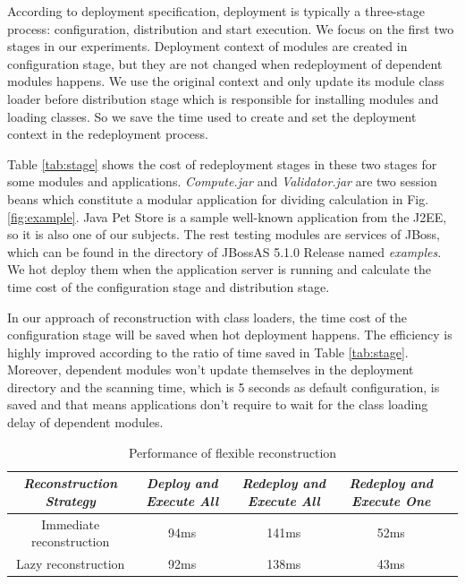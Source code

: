 \documentclass[conference]{IEEEtran}
\begin{document}
According to deployment specification\cite{jsr88}, deployment is typically a three-stage process: configuration, distribution and start execution.
We focus on the first two stages in our experiments.
Deployment context of modules are created in configuration stage, but they are not changed when redeployment of dependent modules happens.
We use the original context and only update its module class loader before distribution stage which is responsible for installing modules and loading classes.
So we save the time used to create and set the deployment context in the redeployment process.

Table \ref{tab:stage} shows the cost of redeployment stages in these two stages for some modules and applications.
\emph{Compute.jar} and \emph{Validator.jar} are two session beans which constitute a modular application for dividing calculation in Fig. \ref{fig:example}.
Java Pet Store\cite{java_pet_store} is a sample well-known application from the J2EE\cite{j2ee}, so it is also one of our subjects.
The rest testing modules are services of JBoss, which can be found in the directory of JBossAS 5.1.0 Release named \emph{examples}.
We hot deploy them when the application server is running and calculate the time cost of the configuration stage and distribution stage.

In our approach of reconstruction with class loaders, the time cost of the configuration stage will be saved when hot deployment happens.
The efficiency is highly improved according to the ratio of time saved in Table \ref{tab:stage}.
Moreover, dependent modules won't update themselves in the deployment directory and the scanning time, which is 5 seconds as default configuration, is saved and that means applications don't require to wait for the class loading delay of dependent modules. 


\begin{table}
\centering
\caption{Performance of flexible reconstruction}
\label{tab:flexibility}
\begin{tabular}{|c|c|c|c|c|}
\hline
\emph{Reconstruction Strategy}	& \emph{Deploy and Execute All}	& \emph{Redeploy and Execute All} & \emph{Redeploy and Execute One}\\
\hline
\hline
Immediate reconstruction 	&	94ms				&	141ms				&	52ms\\
\hline
Lazy reconstruction 	&	92ms				&	138ms				&	43ms\\
\hline
\end{tabular}
\end{table}
\end{document}

